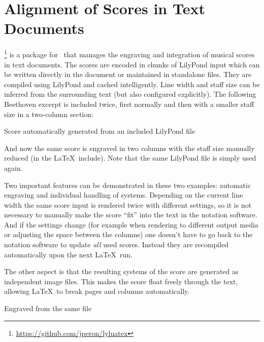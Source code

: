 \documentclass[DIV=12]{scrartcl}
\begin{document}
\section*{Alignment of Scores in Text Documents}

\lyluatex%
\footnote{\url{https://github.com/jperon/lyluatex}}
 is a package for \LuaLaTeX\ that manages the engraving and integration of musical scores in text documents. The scores are encoded in chunks of LilyPond input which can be written directly in the document or maintained in standalone files.  They are compiled using LilyPond and cached intelligently. Line width and staff size can be inferred from the surrounding text (but also configured explicitly). The following Beethoven excerpt is included twice, first normally and then with a smaller staff size in a two-column section:


\begin{musicExampleNonFloat}
\caption{Score automatically generated from an included LilyPond file}
\end{musicExampleNonFloat}

\setlength{\columnsep}{1cm}
\begin{multicols}{2}

And now the same score is engraved in two columns with the staff size manually reduced (in the \LaTeX\ include).  Note that the same LilyPond file is simply used again.

Two important features can be demonstrated in these two examples: automatic engraving and individual handling of systems.  Depending on the current line width the same score input is rendered twice with different settings, so it is not necessary to manually make the score “fit” into the text in the notation software. And if the settings change (for example when rendering to different output media or adjusting the space between the columns) one doesn't have to go back to the notation software to update \emph{all} used scores. Instead they are recompiled automatically upon the next \LaTeX\ run.

The other aspect is that the resulting systems of the score are generated as independent image files. This makes the score float freely through the text, allowing \LaTeX\ to break pages and columns automatically.

\begin{musicExampleNonFloat}
\caption{Engraved from the same file}
\end{musicExampleNonFloat}
\end{multicols}
\end{document}
